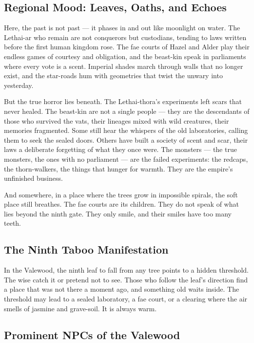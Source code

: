 \documentclass[12pt,oneside]{book}
\begin{document}
\subsection*{Regional Mood: Leaves, Oaths, and Echoes}

Here, the past is not past --- it phases in and out like moonlight on water. The Lethai-ar who remain are not conquerors but custodians, tending to laws written before the first human kingdom rose. The fae courts of Hazel and Alder play their endless games of courtesy and obligation, and the beast-kin speak in parliaments where every vote is a scent. Imperial shades march through walls that no longer exist, and the star-roads hum with geometries that twist the unwary into yesterday.

But the true horror lies beneath. The Lethai-thora's experiments left scars that never healed. The beast-kin are not a single people --- they are the descendants of those who survived the vats, their lineages mixed with wild creatures, their memories fragmented. Some still hear the whispers of the old laboratories, calling them to seek the sealed doors. Others have built a society of scent and scar, their laws a deliberate forgetting of what they once were. The monsters --- the true monsters, the ones with no parliament --- are the failed experiments: the redcaps, the thorn-walkers, the things that hunger for warmth. They are the empire's unfinished business.

And somewhere, in a place where the trees grow in impossible spirals, the soft place still breathes. The fae courts are its children. They do not speak of what lies beyond the ninth gate. They only smile, and their smiles have too many teeth.

\subsection*{The Ninth Taboo Manifestation}
\begin{tcolorbox}[colback=black!3,colframe=red!60!black,title=The Ninth Taboo,breakable]
In the Valewood, the ninth leaf to fall from any tree points to a hidden threshold. The wise catch it or pretend not to see. Those who follow the leaf's direction find a place that was not there a moment ago, and something old waits inside. The threshold may lead to a sealed laboratory, a fae court, or a clearing where the air smells of jasmine and grave-soil. It is always warm.
\end{tcolorbox}

\subsection*{Prominent NPCs of the Valewood}
\label{sec:valewood-npcs}
\end{document}

